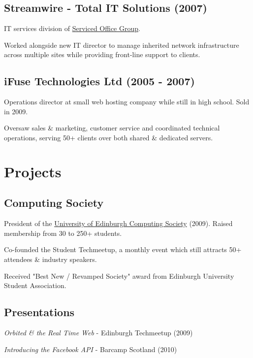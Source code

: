 \documentclass[a4paper]{article}
\renewenvironment{itemize}{
  \begin{list}{}{
    \setlength{\leftmargin}{1.5em}
  }
}{
  \end{list}
}
\begin{document}
\subsection*{Streamwire - Total IT Solutions (2007)}
\begin{itemize}
  \item IT services division of \href{http://servicedofficegroup.com}{Serviced Office Group}.
  \item Worked alongside new IT director to manage inherited network infrastructure across multiple sites while providing front-line support to clients.
\end{itemize}

\subsection*{iFuse Technologies Ltd (2005 - 2007)}
\begin{itemize}
  \item Operations director at small web hosting company while still in high school. Sold in 2009.
  \item Oversaw sales \& marketing, customer service and coordinated technical operations, serving 50+ clients over both shared \& dedicated servers.
\end{itemize}

\section*{Projects}

\subsection*{Computing Society}
\begin{itemize}
\item President of the \href{http://comp-soc.com}{University of Edinburgh Computing Society} (2009). Raised membership from 30 to 250+ students.
\item Co-founded the Student Techmeetup, a monthly event which still attracts 50+ attendees \& industry speakers.
\item Received "Best New / Revamped Society" award from Edinburgh University Student Association.
\end{itemize}

\subsection*{Presentations}
\begin{itemize}
\item \emph{Orbited \& the Real Time Web} - Edinburgh Techmeetup (2009)
\item \emph{Introducing the Facebook API} - Barcamp Scotland (2010)
\end{itemize}
\end{document}
